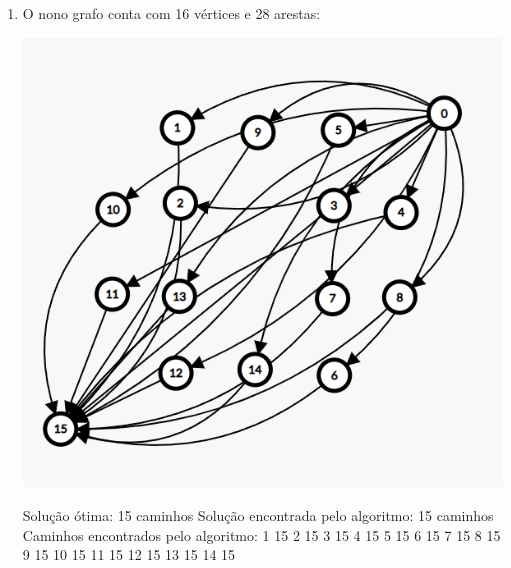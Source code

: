 \begin{enumerate}
    \item O nono grafo conta com 16 vértices e 28 arestas:
    \begin{center}
        \includegraphics[scale=0.5]{figuras/Grafo9.png}
    \end{center}
    Solução ótima: 15 caminhos\newline
    Solução encontrada pelo algoritmo: 15 caminhos\newline
    Caminhos encontrados pelo algoritmo: 1 15  2 15  3 15  4 15  5 15  6 15  7 15  8 15  9 15  10 15  11 15  12 15  13 15  14 15 \newline
    

\end{enumerate}
